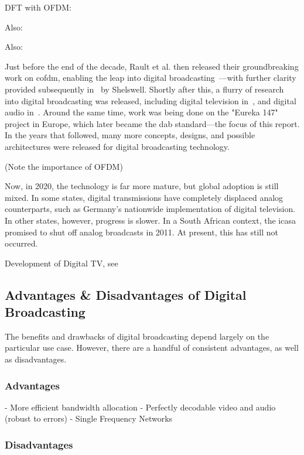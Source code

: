 \documentclass[class=report,11pt,crop=false]{standalone}
\begin{document}
DFT with OFDM: \cite{Weinstein1971}

Also: \cite{lassalle1987principles}

Also: \cite{Alard1988}

Just before the end of the decade, Rault et al. then released their groundbreaking work on \gls{cofdm}, enabling the leap into digital broadcasting~\cite{Raulta}---with further clarity provided subsequently in~\cite{Shelswell1995} by Shelswell. Shortly after this, a flurry of research into digital broadcasting was released, including digital television in~\cite{Bernard1992, stare1992}, and digital audio in~\cite{shelswell1991, Price1992, Maddocks1992}. Around the same time, work was being done on the "Eureka 147" project in Europe, which later became the \gls{dab} standard---the focus of this report. In the years that followed, many more concepts, designs, and possible architectures were released for digital broadcasting technology.

(Note the importance of OFDM)

Now, in 2020, the technology is far more mature, but global adoption is still mixed. In some states, digital transmissions have completely displaced analog counterparts, such as Germany's nationwide implementation of digital television. In other states, however, progress is slower. In a South African context, the \gls{icasa} promised to shut off analog broadcasts in 2011. At present, this has still not occurred.

Development of Digital TV, see~\cite{Wu2006}

\subsection{Advantages \& Disadvantages of Digital Broadcasting}
The benefits and drawbacks of digital broadcasting depend largely on the particular use case. However, there are a handful of consistent advantages, as well as disadvantages.

\subsubsection{Advantages}
- More efficient bandwidth allocation
- Perfectly decodable video and audio (robust to errors)
- Single Frequency Networks

\subsubsection{Disadvantages}
\end{document}
